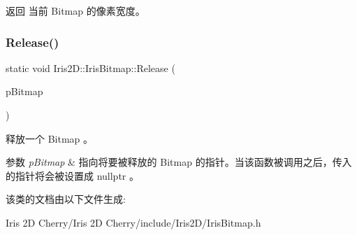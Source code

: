 \begin{DoxyReturn}{返回}
当前 Bitmap 的像素宽度。 
\end{DoxyReturn}
\mbox{\label{class_iris2_d_1_1_iris_bitmap_a30f09c40ae048de40f06c0a1d6575441}} 
\subsubsection{\texorpdfstring{Release()}{Release()}}
{\footnotesize\ttfamily static void Iris2\+D\+::\+Iris\+Bitmap\+::\+Release (\begin{DoxyParamCaption}\item[{\hyperlink{class_iris2_d_1_1_iris_bitmap}{Iris\+Bitmap} $\ast$\&}]{p\+Bitmap }\end{DoxyParamCaption})\hspace{0.3cm}{\ttfamily [static]}}



释放一个 Bitmap 。 


\begin{DoxyParams}{参数}
{\em p\+Bitmap} & 指向将要被释放的 Bitmap 的指针。当该函数被调用之后，传入的指针将会被设置成 nullptr 。 \\
\hline
\end{DoxyParams}


该类的文档由以下文件生成\+:\begin{DoxyCompactItemize}
\item 
Iris 2\+D Cherry/\+Iris 2\+D Cherry/include/\+Iris2\+D/Iris\+Bitmap.\+h\end{DoxyCompactItemize}
